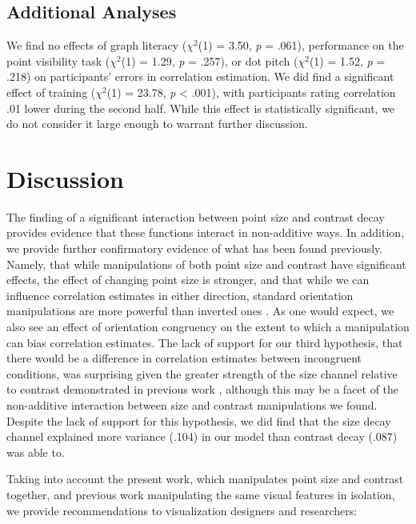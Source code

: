 \documentclass[manuscript, review, anonymous, screen]{acmart}
\begin{document}
\hypertarget{sec-add-analyses}{%
\subsection{Additional Analyses}\label{sec-add-analyses}}

We find no effects of graph literacy (\(\chi^2\)(1) = 3.50, \emph{p} =
.061), performance on the point visibility task (\(\chi^2\)(1) = 1.29,
\emph{p} = .257), or dot pitch (\(\chi^2\)(1) = 1.52, \emph{p} = .218)
on participants' errors in correlation estimation. We did find a
significant effect of training (\(\chi^2\)(1) = 23.78, \emph{p}
\textless{} .001), with participants rating correlation .01 lower during
the second half. While this effect is statistically significant, we do
not consider it large enough to warrant further discussion.

\hypertarget{sec-discussion}{%
\section{Discussion}\label{sec-discussion}}

The finding of a significant interaction between point size and contrast
decay provides evidence that these functions interact in non-additive
ways. In addition, we provide further confirmatory evidence of what has
been found previously. Namely, that while manipulations of both point
size and contrast have significant effects, the effect of changing point
size is stronger, and that while we can influence correlation estimates
in either direction, standard orientation manipulations are more
powerful than inverted ones \citep{strain_2023, strain_2023b}. As one
would expect, we also see an effect of orientation congruency on the
extent to which a manipulation can bias correlation estimates. The lack
of support for our third hypothesis, that there would be a difference in
correlation estimates between incongruent conditions, was surprising
given the greater strength of the size channel relative to contrast
demonstrated in previous work \citep{strain_2023, strain_2023b},
although this may be a facet of the non-additive interaction between
size and contrast manipulations we found. Despite the lack of support
for this hypothesis, we did find that the size decay channel explained
more variance (.104) in our model than contrast decay (.087) was able
to.

Taking into account the present work, which manipulates point size and
contrast together, and previous work manipulating the same visual
features in isolation, we provide recommendations to visualization
designers and researchers:
\end{document}
